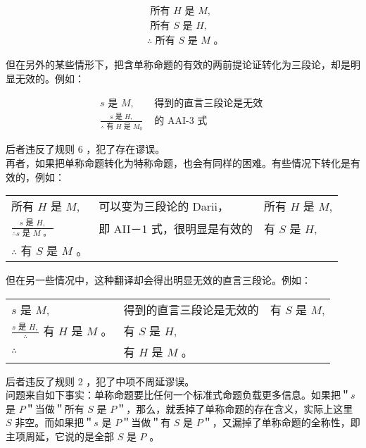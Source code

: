 $$
\begin{aligned}
& \text { 所有 } H \text { 是 } M, \\
& \text { 所有 } S \text { 是 } H, \\
& \therefore \text { 所有 } S \text { 是 } M \text { 。 }
\end{aligned}
$$

但在另外的某些情形下，把含单称命题的有效的两前提论证转化为三段论，却是明显无效的。例如：

$$
\begin{array}{ll}
s \text { 是 } M, & \text { 得到的直言三段论是无效 } \\
\frac{s \text { 是 } H,}{\therefore \text { 有 } H \text { 是 } M_{0}} & \text { 的 AAI-3 式 }
\end{array}
$$

后者违反了规则 6 ，犯了存在谬误。\\
再者，如果把单称命题转化为特称命题，也会有同样的困难。有些情况下转化是有效的，例如：

\begin{center}
\begin{tabular}{lll}
所有 $H$ 是 $M$, & 可以变为三段论的 Darii， & 所有 $H$ 是 $M$, \\
$\frac{s \text { 是 } H,}{\therefore s \text { 是 } M \text { 。 }}$ & 即 AII－1 式，很明显是有效的 & 有 $S$ 是 $H$, \\
$\therefore$ 有 $S$ 是 $M$ 。 &  &  \\
\end{tabular}
\end{center}

但在另一些情况中，这种翻译却会得出明显无效的直言三段论。例如：

\begin{center}
\begin{tabular}{lll}
$s$ 是 $M$, & 得到的直言三段论是无效的 & 有 $S$ 是 $M$, \\
$\frac{s \text { 是 } H,}{\therefore}$ 有 $H$ 是 $M$ 。 & 有 $S$ 是 $H$, &  \\
$\therefore$ & 有 $H$ 是 $M$ 。 &  \\
\end{tabular}
\end{center}

后者违反了规则 2 ，犯了中项不周延谬误。\\
问题来自如下事实：单称命题要比任何一个标准式命题负载更多信息。如果把＂$s$ 是 $P$＂当做＂所有 $S$ 是 $P$＂，那么，就丢掉了单称命题的存在含义，实际上这里 $S$ 非空。而如果把＂$s$ 是 $P$＂当做＂有 $S$ 是 $P$＂，又漏掉了单称命题的全称性，即主项周延，它说的是全部 $S$ 是 $P$ 。

